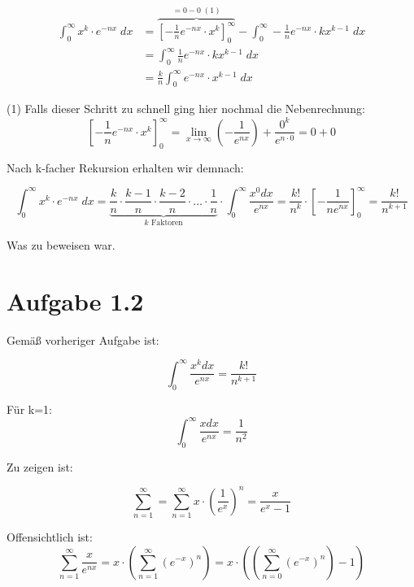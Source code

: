 \documentclass[a4paper,german,12pt,smallheadings]{scrartcl}
\begin{document}
\begin{align*}
  \int_0^\infty x^k \cdot e^{-nx} \; dx &= \overbrace{\left[-\frac{1}{n} e^{-nx} \cdot x^k\right]_0^\infty}^{=0-0\; (1)} - \int_0^\infty -\frac{1}{n}e^{-nx} \cdot kx^{k-1} \; dx \\
                                         &= \int_0^\infty \frac{1}{n}e^{-nx} \cdot kx^{k-1} \; dx \\
                                         &= \frac{k}{n} \int_0^\infty e^{-nx} \cdot x^{k-1} \; dx
\end{align*}

(1) Falls dieser Schritt zu schnell ging hier nochmal die Nebenrechnung:
\begin{equation*}
\left[-\frac{1}{n} e^{-nx} \cdot x^k\right]_0^\infty = \lim\limits_{x \to \infty}\left(-\frac{1}{e^{nx}}\right) + \frac{0^k}{e^{n\cdot 0}}=0 + 0
\end{equation*}

Nach k-facher Rekursion erhalten wir demnach:

\begin{equation*}
  \int_0^\infty x^k \cdot e^{-nx} \; dx = \underbrace{\frac{k}{n} \cdot \frac{k-1}{n} \cdot \frac{k-2}{n} \cdot \dots \cdot \frac{1}{n}}_{k\text{ Faktoren}} \cdot  \int_{0}^{\infty} \frac{x^0dx}{e^{nx}}= \frac{k!}{n^k}\cdot\left[-\frac{1}{ne^{nx}}\right]_0^\infty=\frac{k!}{n^{k+1}}
\end{equation*}

Was zu beweisen war.


\section*{Aufgabe 1.2}

Gemäß vorheriger Aufgabe ist:

\begin{equation*}
\int_{0}^{\infty}\frac{x^kdx}{e^{nx}}=\frac{k!}{n^{k+1}}
\end{equation*}

Für k=1:
\begin{equation*}
\int_{0}^{\infty}\frac{xdx}{e^{nx}}=\frac{1}{n^2}
\end{equation*}

Zu zeigen ist:

\begin{equation*}
\sum_{n=1}^{\infty}=\sum_{n=1}^{\infty}x\cdot\left(\frac{1}{e^x}\right)^n=\frac{x}{e^x-1}
\end{equation*}

Offensichtlich ist:
\begin{equation*}
    \sum_{n=1}^\infty \frac{x}{e^{nx}} = x \cdot \left(\sum_{n=1}^\infty \left(e^{-x}\right)^n\right) = x \cdot \left(\left(\sum_{n=0}^\infty \left(e^{-x}\right)^n\right) - 1\right)
\end{equation*}
\end{document}
